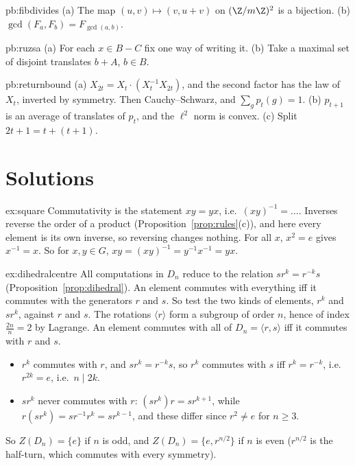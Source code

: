 \begin{hint}{pb:fibdivides}
(a) The map $(u,v)\mapsto(v,u+v)$ on $(\Z/m\Z)^2$ is a bijection. (b) $\gcd(F_a,F_b)=F_{\gcd(a,b)}$.
\end{hint}

\begin{hint}{pb:ruzsa}
(a) For each $x\in B-C$ fix one way of writing it. (b) Take a maximal set of disjoint translates $b+A$, $b\in B$.
\end{hint}

\begin{hint}{pb:returnbound}
(a) $X_{2t}=X_t\cdot(X_t^{-1}X_{2t})$, and the second factor has the law of $X_t$, inverted by symmetry. Then Cauchy--Schwarz, and $\sum_gp_t(g)=1$. (b) $p_{t+1}$ is
an average of translates of $p_t$, and the $\ell^2$ norm is convex. (c) Split $2t+1=t+(t+1)$.
\end{hint}

\section{Solutions}

\begin{solution}{ex:square}
\idea Commutativity is the statement $xy=yx$, i.e.\ $(xy)^{-1}=\dots$. Inverses reverse the order of a product (Proposition~\ref{prop:rules}(c)), and here every element is its own inverse, so reversing changes nothing.
\writeup For all $x$, $x^2=e$ gives $x^{-1}=x$. So for $x,y\in G$, $xy=(xy)^{-1}=y^{-1}x^{-1}=yx$.
\end{solution}

\begin{solution}{ex:dihedralcentre}
\idea All computations in $D_n$ reduce to the relation $sr^k=r^{-k}s$ (Proposition~\ref{prop:dihedral}). An element commutes with everything iff it commutes with the generators $r$ and $s$. So test the two kinds of elements, $r^k$ and $sr^k$, against $r$ and $s$.
\writeup The rotations $\langle r\rangle$ form a subgroup of order $n$, hence of index $\frac{2n}n=2$ by Lagrange. An element commutes with all of $D_n=\langle r,s\rangle$ iff it commutes with $r$ and $s$.
\begin{itemize}
\item $r^k$ commutes with $r$, and $sr^k=r^{-k}s$, so $r^k$ commutes with $s$ iff $r^k=r^{-k}$, i.e.\ $r^{2k}=e$, i.e.\ $n\mid2k$.
\item $sr^k$ never commutes with $r$: $(sr^k)r=sr^{k+1}$, while $r(sr^k)=sr^{-1}r^k=sr^{k-1}$, and these differ since $r^2\ne e$ for $n\ge3$.
\end{itemize}
So $Z(D_n)=\{e\}$ if $n$ is odd, and $Z(D_n)=\{e,r^{n/2}\}$ if $n$ is even ($r^{n/2}$ is the half-turn, which commutes with every symmetry).
\end{solution}


